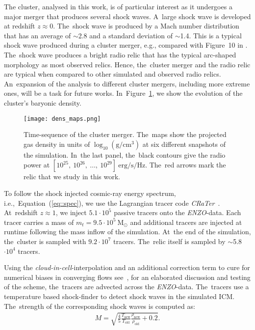 \documentclass[galaxies,article,accept,moreauthors,pdftex]{mdpi}
\newcommand{\enzo}{{\it {\small ENZO}}}
\newcommand{\CRaTer}{{\it {\small CRaTer}}}
\newcommand{\Msun}{\mathrm{M}_{\odot}}
\newcommand{\cm}{\mathrm{cm}}
\newcommand{\sek}{\mathrm{s}}
\newcommand{\erg}{\mathrm{erg}}
\newcommand{\Hz}{\mathrm{Hz}}
\newcommand{\gram}{\mathrm{g}}
\begin{document}
{{The cluster, analysed in this work, is of particular interest as it undergoes a major merger that produces several shock waves. A~large shock wave is developed at redshift $z \approx 0$. The~shock wave is produced by a Mach number distribution that has an average of $\sim$2.8 and a standard deviation of $\sim$1.4. This is a typical shock wave produced during a cluster merger, e.g., compared with Figure~10 in \citep[][]{wittor2021mach}. The~shock wave produces a bright radio relic that has the typical arc-shaped morphology as most observed relics. Hence, the~cluster merger and the radio relic are typical when compared to other simulated and observed radio relics. An~expansion of the analysis to different cluster mergers, including more extreme ones, will be a task for future works. In~Figure~\ref{fig::dens_maps}, we show the evolution of the cluster's baryonic density.}}
\begin{figure}[H]
 \texttt{[image: dens\_maps.png]}
 \caption{Time-sequence of the cluster merger. The~maps show the projected gas density in units of $\log_{10}(\gram/\cm^3)$ at six different snapshots of the simulation. In~the last panel, the~black contours give the radio power at $[10^{25}, \ 10^{26}, \ \dots, \ 10^{29}] \ \erg/\sek/\Hz$. The~red arrows mark the relic that we study in this work.}
 \label{fig::dens_maps}
\end{figure}

To follow the shock injected cosmic-ray energy spectrum, i.e.,~Equation~(\ref{eq::spec}), we use the Lagrangian tracer code \CRaTer \ \cite{2016Galax...4...71W,2017MNRAS.464.4448W,2017MNRAS.471.3212W,wittor2020gammas}. At~redshift $z \approx 1$, we inject $5.1 \cdot 10^5$ passive tracers onto the \enzo-data. Each tracer carries a mass of $m_t = 9.5\cdot10^5 \ \Msun$ and additional tracers are injected at runtime following the mass inflow of the simulation. At~the end of the simulation, the~cluster is sampled with $9.2 \cdot 10^7$ tracers. The~relic itself is sampled by $\sim$5.8 $\cdot 10^4$ tracers.

Using the \textit{cloud-in-cell}-interpolation and an additional correction term to cure for numerical biases in converging flows see~\cite{myphdthesis}, for an elaborated discussion and testing of the scheme, the~tracers are advected across the \enzo-data. The~tracers use a temperature based shock-finder to detect shock waves in the simulated ICM. The~strength of the corresponding shock waves is computed as:
\begin{align}
 M = \sqrt{\frac{4}{5} \frac{T_{\mathrm{new}}}{T_{\mathrm{old}}} \frac{\rho_{\mathrm{new}}}{\rho_{\mathrm{old}}} + 0.2}.
\end{align}
\end{document}

